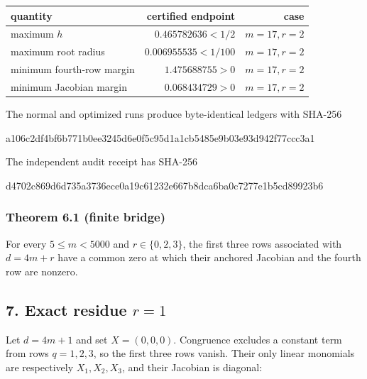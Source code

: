 \documentclass[
  11pt,
  a4paper,
]{article}
\newenvironment{Shaded}{}{}
\newcommand{\NormalTok}[1]{#1}
\newcounter{none} %
\begin{document}
{\def\LTcaptype{none} %
\begin{longtable}[]{@{}lrr@{}}
\toprule\noalign{}
quantity & certified endpoint & case \\
\midrule\noalign{}
\endhead
\bottomrule\noalign{}
\endlastfoot
maximum \(h\) & \(0.465782636<1/2\) & \(m=17,r=2\) \\
maximum root radius & \(0.006955535<1/100\) & \(m=17,r=2\) \\
minimum fourth-row margin & \(1.475688755>0\) & \(m=17,r=2\) \\
minimum Jacobian margin & \(0.068434729>0\) & \(m=17,r=2\) \\
\end{longtable}
}

The normal and optimized runs produce byte-identical ledgers with
SHA-256

\begin{Shaded}
\begin{Highlighting}[]
\NormalTok{a106c2df4bf6b771b0ee3245d6e0f5c95d1a1cb5485e9b03e93d942f77ccc3a1}
\end{Highlighting}
\end{Shaded}

The independent audit receipt has SHA-256

\begin{Shaded}
\begin{Highlighting}[]
\NormalTok{d4702c869d6d735a3736ece0a19c61232e667b8dca6ba0c7277e1b5cd89923b6}
\end{Highlighting}
\end{Shaded}

\subsubsection{Theorem 6.1 (finite
bridge)}\label{theorem-6.1-finite-bridge}

For every \(5\le m<5000\) and \(r\in\{0,2,3\}\), the first three rows
associated with \(d=4m+r\) have a common zero at which their anchored
Jacobian and the fourth row are nonzero.

\subsection{\texorpdfstring{7. Exact residue
\(r=1\)}{7. Exact residue r=1}}\label{exact-residue-r1}

Let \(d=4m+1\) and set \(X=(0,0,0)\). Congruence excludes a constant
term from rows \(q=1,2,3\), so the first three rows vanish. Their only
linear monomials are respectively \(X_1,X_2,X_3\), and their Jacobian is
diagonal:
\end{document}
